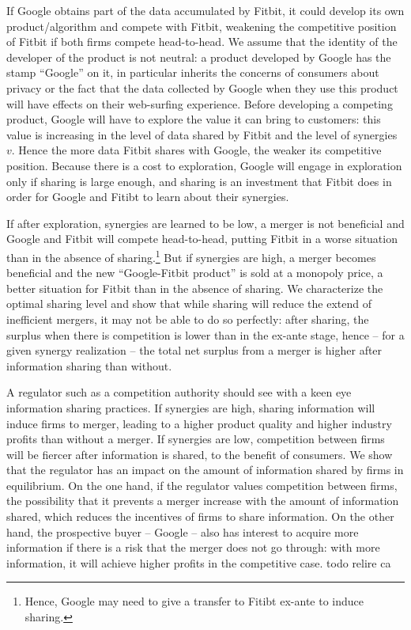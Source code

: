 \documentclass[a4paper,leqno]{article}%
\begin{document}
If Google obtains part of the data accumulated by Fitbit, it could develop its own product/algorithm and compete with Fitbit, weakening the competitive position of Fitbit if both firms compete head-to-head. We assume that the identity of the developer of the product is not neutral: a product developed by Google has the stamp ``Google'' on it, in particular inherits the concerns of consumers about privacy or the fact that the data collected by Google when they use this product will have effects on their web-surfing experience. Before developing a competing product, Google will have to explore the value it can bring to customers: this value is increasing in the level of data shared by Fitbit and the level of synergies $v$. Hence the more data Fitbit shares with Google, the weaker its competitive position. Because there is a cost to exploration, Google will engage in exploration only if sharing is large enough, and sharing is an investment that Fitbit does in order for Google and Fitibt to learn about their synergies.

If after exploration, synergies are learned to be low, a merger is not beneficial and Google and Fitbit will compete head-to-head, putting Fitbit in a worse situation than in the absence of sharing.\footnote{Hence, Google may need to give a transfer to Fitibt ex-ante to induce sharing.} But if synergies are high, a merger becomes beneficial and the new ``Google-Fitbit product'' is sold at a monopoly price, a better situation for Fitbit than in the absence of sharing. We characterize the optimal sharing level and show that while sharing will reduce the extend of inefficient mergers, it may not be able to do so perfectly: after sharing, the surplus when there is competition is lower than in the ex-ante stage, hence -- for a given synergy realization --  the total net surplus from a merger is higher after information sharing than without.


A regulator such as a competition authority should see with a keen eye information sharing practices. If synergies are high, sharing information will induce firms to merger, leading to a higher product quality and higher industry profits than without a merger. If synergies are low, competition between firms will be fiercer after information is shared, to the benefit of consumers. We show that the regulator has an impact on the amount of information shared by firms in equilibrium. On the one hand, if the regulator values competition between firms, the possibility that it prevents a merger increase with the amount of information shared, which reduces the incentives of firms to share information. On the other hand, the prospective buyer -- Google -- also has interest to acquire more information if there is a risk that the merger does not go through: with more information, it will achieve higher profits in the competitive case. 
todo relire ca
\end{document}
